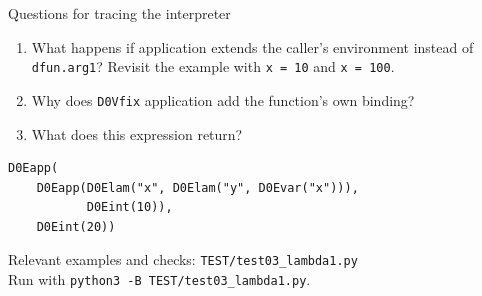 \documentclass[aspectratio=169,11pt]{beamer}
\begin{document}
\begin{frame}[fragile]{Questions for tracing the interpreter}
\begin{enumerate}
\item What happens if application extends the caller's environment instead of
\texttt{dfun.arg1}? Revisit the example with \texttt{x = 10} and \texttt{x = 100}.
\item Why does \texttt{D0Vfix} application add the function's own binding?
\item What does this expression return?
\end{enumerate}
\begin{lstlisting}
D0Eapp(
    D0Eapp(D0Elam("x", D0Elam("y", D0Evar("x"))),
           D0Eint(10)),
    D0Eint(20))
\end{lstlisting}
\medskip
Relevant examples and checks: \texttt{TEST/test03\_lambda1.py}\\
Run with \texttt{python3 -B TEST/test03\_lambda1.py}.
\end{frame}
\end{document}
